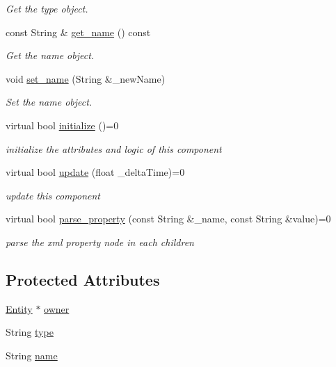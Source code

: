 \begin{DoxyCompactItemize}
\begin{DoxyCompactList}\small\item\em Get the type object. \end{DoxyCompactList}\item 
const String \& \mbox{\hyperlink{classbanita_1_1_component_ae4bb6625c9d7ed340b4e1d41ef85f4ed}{get\+\_\+name}} () const
\begin{DoxyCompactList}\small\item\em Get the name object. \end{DoxyCompactList}\item 
void \mbox{\hyperlink{classbanita_1_1_component_a8a88347900a1cbfbc8069c57ce162abd}{set\+\_\+name}} (String \&\+\_\+new\+Name)
\begin{DoxyCompactList}\small\item\em Set the name object. \end{DoxyCompactList}\item 
virtual bool \mbox{\hyperlink{classbanita_1_1_component_a2f700c071185f7033caa69576dafa9e7}{initialize}} ()=0
\begin{DoxyCompactList}\small\item\em initialize the attributes and logic of this component \end{DoxyCompactList}\item 
virtual bool \mbox{\hyperlink{classbanita_1_1_component_ae8f9d11dc8e3c920d6d40146668c429b}{update}} (float \+\_\+delta\+Time)=0
\begin{DoxyCompactList}\small\item\em update this component \end{DoxyCompactList}\item 
virtual bool \mbox{\hyperlink{classbanita_1_1_component_a619154ef2bed8e4493413bdef6117716}{parse\+\_\+property}} (const String \&\+\_\+name, const String \&value)=0
\begin{DoxyCompactList}\small\item\em parse the xml property node in each children \end{DoxyCompactList}\end{DoxyCompactItemize}
\subsection*{Protected Attributes}
\begin{DoxyCompactItemize}
\item 
\mbox{\hyperlink{classbanita_1_1_entity}{Entity}} $\ast$ \mbox{\hyperlink{classbanita_1_1_component_a07c865f44bee743430ed80ab182c6881}{owner}}
\item 
String \mbox{\hyperlink{classbanita_1_1_component_ad3a027af9ddc4fa9479d7b53449e91b5}{type}}
\item 
String \mbox{\hyperlink{classbanita_1_1_component_a61fdddb6f5b235753aca4cedc9aca588}{name}}
\end{DoxyCompactItemize}


